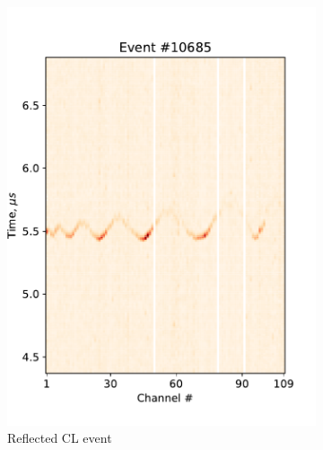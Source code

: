 \documentclass[a4paper,11pt]{article}
\begin{document}
\begin{figure}
\begin{minipage}{.3\textwidth}
        \caption{Overview of the proposed SPHERE-3 detector operation with both reflected and direct CL being observed.}
        \label{fig:DirectCL}
        \end{minipage}
    \hfill
    \begin{minipage}{.67\textwidth}
        \centering
        \begin{subfigure}[t]{0.42\textwidth}
            \centering
            \includegraphics[width=\textwidth]{reflected-event}
            \caption{Reflected CL event}
            \label{fig:reflected-ev-1}
        \end{subfigure}
        \begin{subfigure}[t]{0.42\textwidth}
            \centering

\end{subfigure}
\end{minipage}
\end{figure}
\end{document}
